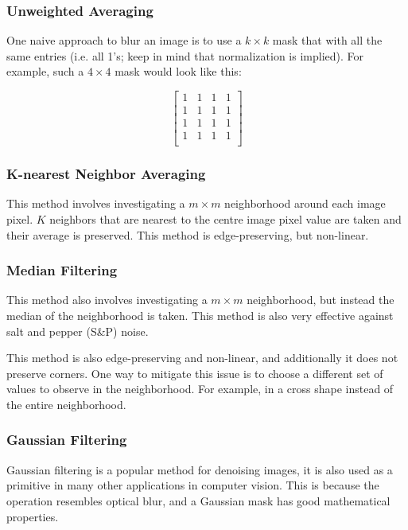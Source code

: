 \documentclass{article}
\begin{document}
\begin{multicols}{3}
\subsubsection{Unweighted Averaging}

One naive approach to blur an image is to use a $k \times k$ mask that with all the same entries (i.e. all 1's; keep in mind that normalization is implied). For example, such a $4 \times 4$ mask would look like this:

$$
\left[\begin{matrix} 1&1&1&1\\1&1&1&1\\1&1&1&1\\1&1&1&1\\\end{matrix}\right]
$$

\subsubsection{K-nearest Neighbor Averaging}

This method involves investigating a $m \times m$ neighborhood around each image pixel. $K$ neighbors that are nearest to the centre image pixel value are taken and their average is preserved. This method is edge-preserving, but non-linear.

\subsubsection{Median Filtering}

This method also involves investigating a $m \times m$ neighborhood, but instead the median of the neighborhood is taken. This method is also very effective against salt and pepper (S\&P) noise.

This method is also edge-preserving and non-linear, and additionally it does not preserve corners. One way to mitigate this issue is to choose a different set of values to observe in the neighborhood. For example, in a cross shape instead of the entire neighborhood.

\subsubsection{Gaussian Filtering}

Gaussian filtering is a popular method for denoising images, it is also used as a primitive in many other applications in computer vision. This is because the operation resembles optical blur, and a Gaussian mask has good mathematical properties.


\end{multicols}
\end{document}
